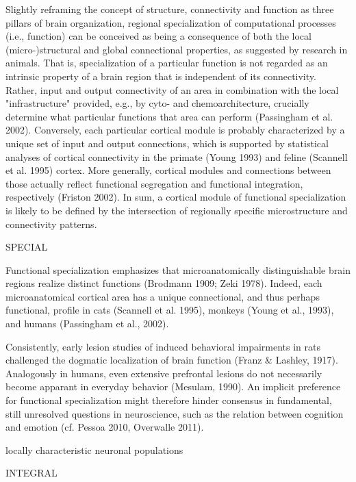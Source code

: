 \documentclass{article} %
\begin{document}
Slightly reframing the concept of structure, connectivity and function as three pillars of brain organization, regional specialization of computational processes (i.e., function) can be conceived as being a consequence of both the local (micro-)structural and global connectional properties, as suggested by research in animals. That is, specialization of a particular function is not regarded as an intrinsic property of a brain region that is independent of its connectivity. Rather, input and output connectivity of an area in combination with the local "infrastructure" provided, e.g., by cyto- and chemoarchitecture, crucially determine what particular functions that area can perform (Passingham et al. 2002). Conversely, each particular cortical module is probably characterized by a unique set of input and output connections, which is supported by statistical analyses of cortical connectivity in the primate (Young 1993) and feline (Scannell et al. 1995) cortex. More generally, cortical modules and connections between those actually reflect functional segregation and functional integration, respectively (Friston 2002). In sum, a cortical module of functional specialization is likely to be defined by the intersection of regionally specific microstructure and connectivity patterns. 






SPECIAL

Functional
specialization emphasizes that microanatomically distinguishable brain
regions realize distinct functions (Brodmann 1909; Zeki 1978). Indeed,
each microanatomical cortical area has a unique connectional, and thus
perhaps functional, profile in cats (Scannell et al. 1995), monkeys
(Young et al., 1993), and humans (Passingham et al., 2002).


Consistently, early lesion studies of induced behavioral
impairments in rats challenged the dogmatic localization of brain
function (Franz \& Lashley, 1917). Analogously in humans, even
extensive prefrontal lesions do not necessarily become apparant in
everyday behavior (Mesulam, 1990). An implicit preference for
functional specialization might therefore hinder consensus in
fundamental, still unresolved questions in neuroscience, such as the
relation between cognition and emotion (cf. Pessoa 2010, Overwalle
2011).

locally characteristic neuronal populations




INTEGRAL
\end{document}
